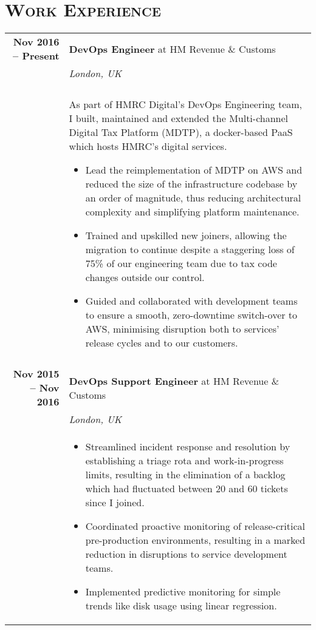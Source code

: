 \documentclass[a4paper,10pt]{article} %
\begin{document}
\section{\textsc{Work Experience}}
\centering
\begin{tabularx}{\textwidth}{r|X}

\textbf{Nov 2016 -- Present}        & \textbf{DevOps Engineer} at HM Revenue \& Customs \\
                                    & \emph{London, UK} \\
                                    & \\
                                    & \footnotesize
    {As part of HMRC Digital's DevOps Engineering team, I built, maintained and
    extended the Multi-channel Digital Tax Platform (MDTP), a docker-based PaaS
    which hosts HMRC's digital services.
    \begin{itemize}
    \item Lead the reimplementation of MDTP on AWS and reduced the size of the
    infrastructure codebase by an order of magnitude, thus reducing
    architectural complexity and simplifying platform maintenance.
    \item Trained and upskilled new joiners, allowing the migration to continue
    despite a staggering loss of 75\% of our engineering team due to tax code
    changes outside our control.
    \item Guided and collaborated with development teams to ensure a smooth,
    zero-downtime switch-over to AWS, minimising disruption both to services'
    release cycles and to our customers.
    \end{itemize}}\\

\multicolumn{2}{r}{} \\ %

\textbf{Nov 2015 -- Nov 2016}       & \textbf{DevOps Support Engineer} at HM Revenue \& Customs \\
                                    & \emph{London, UK} \\
                                    & \footnotesize
    {\begin{itemize}[after=\vspace{-2\baselineskip}]
    \item Streamlined incident response and resolution by establishing a triage
    rota and work-in-progress limits, resulting in the elimination of a backlog
    which had fluctuated between 20 and 60 tickets since I joined.
    \item Coordinated proactive monitoring of release-critical pre-production
    environments, resulting in a marked reduction in disruptions to service
    development teams.
    \item Implemented predictive monitoring for simple trends like disk usage
    using linear regression.
    \end{itemize}}\\


\end{tabularx}
\end{document}
